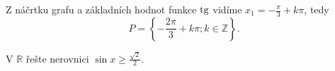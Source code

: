 \begin{reseni}
Z náčrtku grafu a základních hodnot funkce $\operatorname{tg}$ vidíme $x_1=-\frac{\pi}{3}+k\pi$, tedy
$$P = \left \{-\frac{2\pi}{3}+k\pi; k \in \mathbb Z\right\}.$$

\end{reseni}

\begin{priklad}\label{gonrce3}
V $\mathbb R$ řešte nerovnici $\sin x \geq \frac{\sqrt{2}}{2}.$
\end{priklad}

